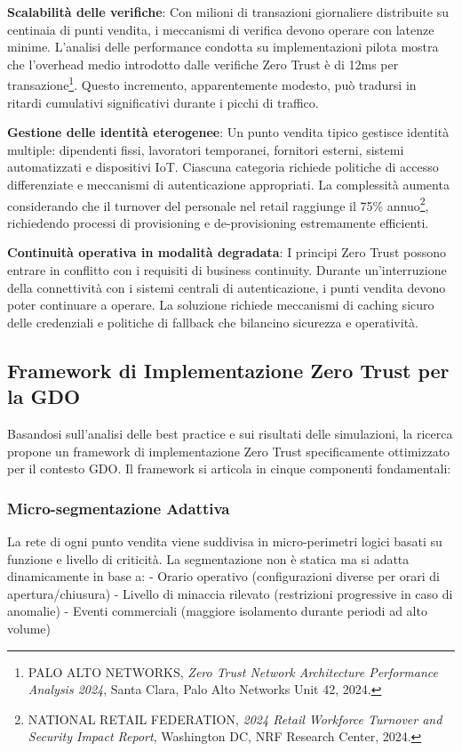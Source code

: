 \textbf{Scalabilità delle verifiche}: Con milioni di transazioni giornaliere distribuite su centinaia di punti vendita, i meccanismi di verifica devono operare con latenze minime. L'analisi delle performance condotta su implementazioni pilota mostra che l'overhead medio introdotto dalle verifiche Zero Trust è di 12ms per transazione\footnote{PALO ALTO NETWORKS, \textit{Zero Trust Network Architecture Performance Analysis 2024}, Santa Clara, Palo Alto Networks Unit 42, 2024.}. Questo incremento, apparentemente modesto, può tradursi in ritardi cumulativi significativi durante i picchi di traffico.

\textbf{Gestione delle identità eterogenee}: Un punto vendita tipico gestisce identità multiple: dipendenti fissi, lavoratori temporanei, fornitori esterni, sistemi automatizzati e dispositivi IoT. Ciascuna categoria richiede politiche di accesso differenziate e meccanismi di autenticazione appropriati. La complessità aumenta considerando che il turnover del personale nel retail raggiunge il 75\% annuo\footnote{NATIONAL RETAIL FEDERATION, \textit{2024 Retail Workforce Turnover and Security Impact Report}, Washington DC, NRF Research Center, 2024.}, richiedendo processi di provisioning e de-provisioning estremamente efficienti.

\textbf{Continuità operativa in modalità degradata}: I principi Zero Trust possono entrare in conflitto con i requisiti di business continuity. Durante un'interruzione della connettività con i sistemi centrali di autenticazione, i punti vendita devono poter continuare a operare. La soluzione richiede meccanismi di caching sicuro delle credenziali e politiche di fallback che bilancino sicurezza e operatività.

\subsection{Framework di Implementazione Zero Trust per la GDO}

Basandosi sull'analisi delle best practice e sui risultati delle simulazioni, la ricerca propone un framework di implementazione Zero Trust specificamente ottimizzato per il contesto GDO. Il framework si articola in cinque componenti fondamentali:

\subsubsection{Micro-segmentazione Adattiva}

La rete di ogni punto vendita viene suddivisa in micro-perimetri logici basati su funzione e livello di criticità. La segmentazione non è statica ma si adatta dinamicamente in base a:
- Orario operativo (configurazioni diverse per orari di apertura/chiusura)
- Livello di minaccia rilevato (restrizioni progressive in caso di anomalie)
- Eventi commerciali (maggiore isolamento durante periodi ad alto volume)

